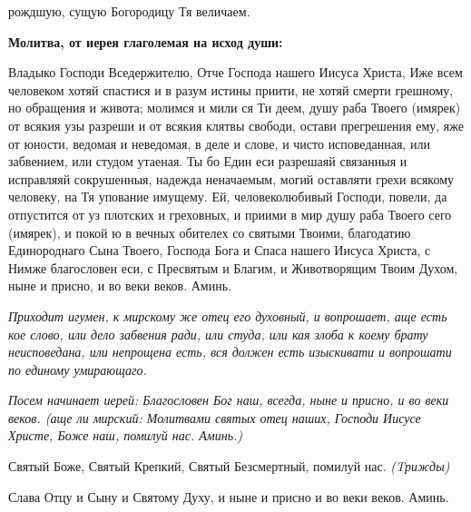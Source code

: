 рождшую, сущую Богородицу Тя величаем.



 

\bfseries Молитва, от иерея глаголемая на исход души:\normalfont{}


   Владыко Господи Вседержителю, Отче Господа нашего Иисуса Христа,
Иже всем человеком хотяй спастися и в разум истины приити, не хотяй
смерти грешному, но обращения и живота; молимся и мили ся Ти деем, душу
раба Твоего (имярек) от всякия узы разреши и от всякия клятвы свободи,
остави прегрешения ему, яже от юности, ведомая и неведомая, в деле и
слове, и чисто исповеданная, или забвением, или студом утаеная.
Ты бо Един еси разрешаяй связанныя и исправляяй сокрушенныя,
надежда неначаемым, могий оставляти грехи всякому человеку, на
Тя упование имущему. Ей, человеколюбивый Господи, повели, да
отпустится от уз плотских и греховных, и приими в мир душу раба Твоего
сего (имярек), и покой ю в вечных обителех со святыми Твоими,
благодатию Единороднаго Сына Твоего, Господа Бога и Спаса нашего
Иисуса Христа, с Нимже благословен еси, с Пресвятым и Благим,
и Животворящим Твоим Духом, ныне и присно, и во веки веков.
Аминь.

   

\mychapterending

 
 

\itshape  Приходит игумен, к мирскому же отец его духовный, и вопрошает, аще есть
кое слово, или дело забвения ради, или студа, или кая злоба к коему брату
неисповедана, или непрощена есть, вся должен есть изыскивати и вопрошати
по единому умирающаго.\normalfont{}



 \itshape Посем начинает иерей:\normalfont{} Благословен Бог наш, всегда, ныне и присно, и во
веки веков. (\itshape аще ли мирский:\normalfont{} Молитвами святых отец наших, Господи
Иисусе Христе, Боже наш, помилуй нас. Аминь.)



   Святый Боже, Святый Крепкий, Святый Безсмертный, помилуй нас. \itshape 
(Tрижды)\normalfont{}



   Слава Отцу и Сыну и Святому Духу, и ныне и присно и во веки веков.
Аминь.



